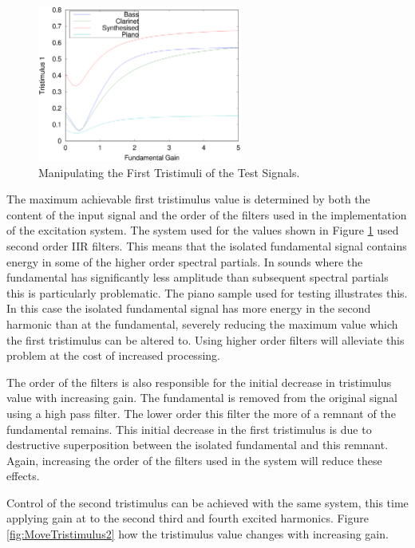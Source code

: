 			\begin{figure}[h!]
				\centering
				\includegraphics[width=0.6\textwidth]{chapter6/Images/MoveTristimulus1.eps}
				\caption{Manipulating the First Tristimuli of the Test Signals.}
				\label{fig:MoveTristimulus1}
			\end{figure}

			The maximum achievable first tristimulus value is determined by both the content of the input
			signal and the order of the filters used in the implementation of the excitation system. The system
			used for the values shown in Figure \ref{fig:MoveTristimulus1} used second order IIR filters. This
			means that the isolated fundamental signal contains energy in some of the higher order spectral
			partials. In sounds where the fundamental has significantly less amplitude than subsequent spectral
			partials this is particularly problematic. The piano sample used for testing illustrates this. In
			this case the isolated fundamental signal has more energy in the second harmonic than at the
			fundamental, severely reducing the maximum value which the first tristimulus can be altered to.
			Using higher order filters will alleviate this problem at the cost of increased processing.

			The order of the filters is also responsible for the initial decrease in tristimulus value with
			increasing gain. The fundamental is removed from the original signal using a high pass filter. The
			lower order this filter the more of a remnant of the fundamental remains. This initial decrease in
			the first tristimulus is due to destructive superposition between the isolated fundamental and this
			remnant. Again, increasing the order of the filters used in the system will reduce these effects.

			Control of the second tristimulus can be achieved with the same system, this time applying gain at
			to the second third and fourth excited harmonics. Figure \ref{fig:MoveTristimulus2} how the
			tristimulus value changes with increasing gain.

